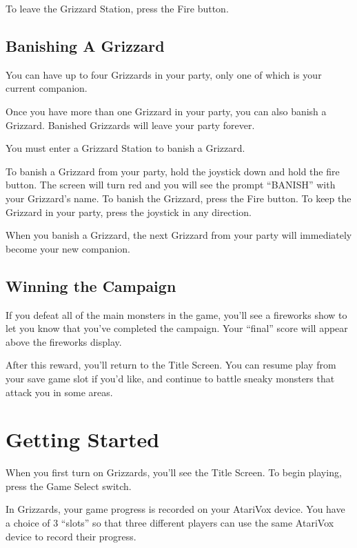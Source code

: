 \documentclass[10pt,twoside,openright]{memoir}
\begin{document}
To leave the Grizzard Station, press the Fire button.



\section{Banishing A Grizzard}

You can have up to four Grizzards in your party, only one of which is your
current companion.

Once you have more than one Grizzard in your party, you can also banish a
Grizzard.  Banished Grizzards will leave your party forever.  

You must enter a Grizzard Station to banish a Grizzard.

To banish  a Grizzard from your  party, hold the joystick  down and hold
the fire button.  The screen will turn  red and you will  see the prompt
``BANISH'' with your Grizzard's name.  To banish the Grizzard, press the
Fire button. To  keep the Grizzard in your party,  press the joystick in
any direction.

When you banish a Grizzard, the next Grizzard from your party will
immediately become your new companion.



\section{Winning the Campaign}

If you defeat all of the main monsters in the game, you'll see a fireworks
show to let you know that you've completed the campaign. Your ``final''
score will appear above the fireworks display.

After this reward, you'll return to the Title Screen. You can resume play
from your save game slot if you'd like, and continue to battle sneaky
monsters that attack you in some areas.



\chapter{Getting Started}\label{Getting Started}

When you first turn on Grizzards, you'll see the Title
Screen. To begin playing, press the Game Select switch.

In  Grizzards,  your game  progress is  recorded on  your
AtariVox  device. You  have  a choice  of 3  ``slots''  so that  three
different players  can use  the same AtariVox  device to  record their
progress.
\end{document}
